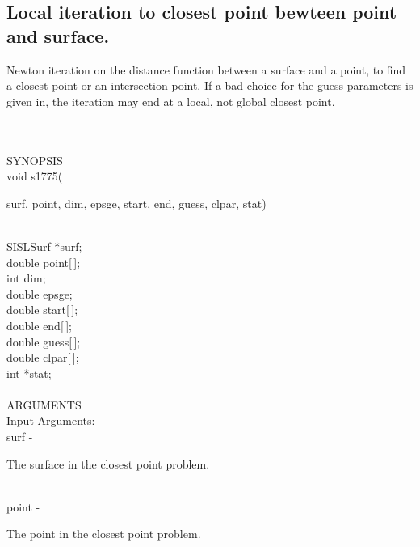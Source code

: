\subsection{Local iteration to closest point bewteen point and surface.}
\begin{minipg1}
Newton iteration on the distance function between
               a surface and a point, to find a closest point or an
               intersection point.
               If a bad choice for the guess parameters is given in, the
               iteration may end at a local, not global closest point.
\end{minipg1} \\ \\
SYNOPSIS\\
        \> void s1775(\begin{minipg3}
            {\fov surf},  {\fov point},  {\fov dim},  {\fov epsge},  {\fov start},  {\fov end},  {\fov guess},  {\fov clpar},  {\fov stat})
                \end{minipg3}\\
                \>\>    SISLSurf \> *{\fov surf};\\
                \>\>    double \> {\fov point}[\,];\\
                \>\>    int \> {\fov dim};\\
                \>\>    double \> {\fov epsge};\\
                \>\>    double \> {\fov start}[\,];\\
                \>\>    double \> {\fov end}[\,];\\
                \>\>    double \> {\fov guess}[\,];\\
                \>\>    double \> {\fov clpar}[\,];\\
                \>\>    int \> *{\fov stat};\\
\\
ARGUMENTS\\
	\>Input Arguments:\\
        \>\>    {\fov surf}\> - \>  \begin{minipg2}
                     The surface in the closest point problem.
                               \end{minipg2}\\
        \>\>    {\fov point}\> - \>  \begin{minipg2}
                     The point in the closest point problem.
                               \end{minipg2}\\
